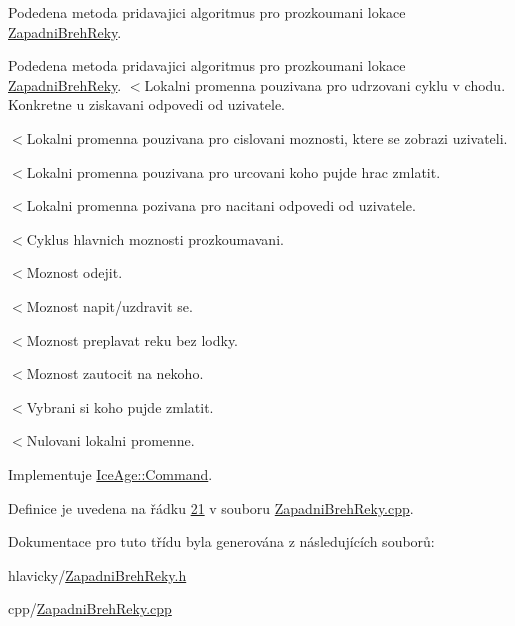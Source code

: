 Podedena metoda pridavajici algoritmus pro prozkoumani lokace \hyperlink{classIceAge_1_1ZapadniBrehReky}{Zapadni\+Breh\+Reky}. 

Podedena metoda pridavajici algoritmus pro prozkoumani lokace \hyperlink{classIceAge_1_1ZapadniBrehReky}{Zapadni\+Breh\+Reky}. $<$Lokalni promenna pouzivana pro udrzovani cyklu v chodu. Konkretne u ziskavani odpovedi od uzivatele.

$<$Lokalni promenna pouzivana pro cislovani moznosti, ktere se zobrazi uzivateli.

$<$Lokalni promenna pouzivana pro urcovani koho pujde hrac zmlatit.

$<$Lokalni promenna pozivana pro nacitani odpovedi od uzivatele.

$<$Cyklus hlavnich moznosti prozkoumavani.

$<$Moznost odejit.

$<$Moznost napit/uzdravit se.

$<$Moznost preplavat reku bez lodky.

$<$Moznost zautocit na nekoho.

$<$Vybrani si koho pujde zmlatit.

$<$Nulovani lokalni promenne. 

Implementuje \hyperlink{classIceAge_1_1Command_a0466e88c0c9e2a44618c12f6c88b76fe}{Ice\+Age\+::\+Command}.



Definice je uvedena na řádku \hyperlink{ZapadniBrehReky_8cpp_source_l00021}{21} v souboru \hyperlink{ZapadniBrehReky_8cpp_source}{Zapadni\+Breh\+Reky.\+cpp}.



Dokumentace pro tuto třídu byla generována z následujících souborů\+:\begin{DoxyCompactItemize}
\item 
hlavicky/\hyperlink{ZapadniBrehReky_8h}{Zapadni\+Breh\+Reky.\+h}\item 
cpp/\hyperlink{ZapadniBrehReky_8cpp}{Zapadni\+Breh\+Reky.\+cpp}\end{DoxyCompactItemize}
